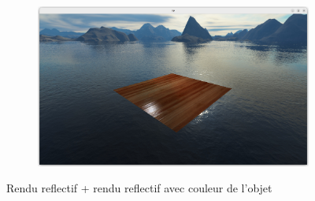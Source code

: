 \documentclass{article}
\begin{document}
\begin{figure}[h]
\begin{subfigure}[b]{0.49\textwidth}
     \end{subfigure}
     \hfill
     \begin{subfigure}[b]{0.49\textwidth}
         \centering
         \includegraphics[width=\textwidth]{images/bizarrie2.png}
     \end{subfigure}
        \caption{Rendu reflectif + rendu reflectif avec couleur de l'objet}
        \label{fig:renduReflectif}
\end{figure}
\end{document}

